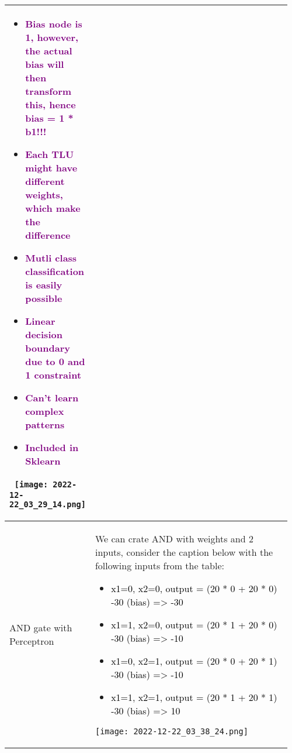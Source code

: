 \documentclass[main.tex,fontsize=8pt,paper=a4,paper=portrait,DIV=calc,]{scrartcl}
\begin{document}
\begin{table}[ht!]
\begin{tabular}{|m{0.2\linewidth}|m{0.755\linewidth}|}
\begin{itemize}
\item \textcolor{purple}{Bias node is 1, however, the actual bias will then transform this, hence bias = 1 * b1!!!}
\item \textcolor{purple}{Each TLU might have different weights, which make the difference}
\item \textcolor{purple}{Mutli class classification is easily possible}
\item \textcolor{purple}{Linear decision boundary due to 0 and 1 constraint}
\item \textcolor{purple}{Can't learn complex patterns}
\item \textcolor{purple}{Included in Sklearn}
\end{itemize} 
\, \newline
\texttt{[image: 2022-12-22\_03\_29\_14.png]}
\\
\hline
AND gate with Perceptron & 
We can crate AND with weights and 2 inputs, consider the caption below with the following inputs from the table:\newline
\begin{itemize}
\item \textcolor{black}{x1=0, x2=0, output = (20 * 0 + 20 * 0) -30 (bias) => -30}
\item \textcolor{black}{x1=1, x2=0, output = (20 * 1 + 20 * 0) -30 (bias) => -10}
\item \textcolor{black}{x1=0, x2=1, output = (20 * 0 + 20 * 1) -30 (bias) => -10}
\item \textcolor{black}{x1=1, x2=1, output = (20 * 1 + 20 * 1) -30 (bias) => 10}
\end{itemize} 
\texttt{[image: 2022-12-22\_03\_38\_24.png]}
\\
\hline
\end{tabular}
\end{table}
\pagebreak
\end{document}
